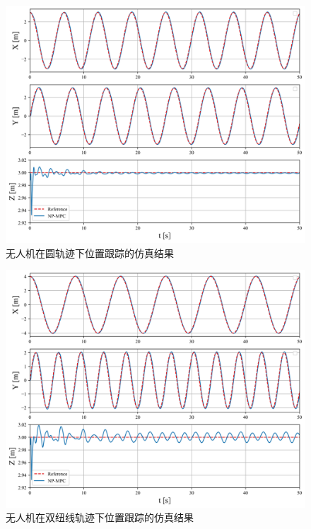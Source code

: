 \documentclass[lang=chs, degree=master, blindreview=true, winfonts=true]{yanputhesis}
\begin{document}
\begin{figure}[hbt!]
	\centering
	\includegraphics[width=33pc]{picture/kk/yuan.png} 
	\vspace{-0.2cm}
	\caption{无人机在圆轨迹下位置跟踪的仿真结果} 
	\label{yuan}
\end{figure}
\begin{figure}[hbt!]
	\centering
	\includegraphics[width=33pc]{picture/kk/bazi.png} 
	\vspace{-0.2cm}
	\caption{无人机在双纽线轨迹下位置跟踪的仿真结果} 
	\label{bazi}
\end{figure}
\end{document}
